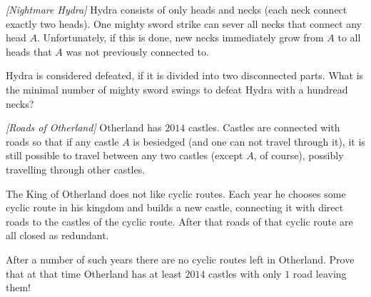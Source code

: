 \begin{problem}
\textit{[Nightmare Hydra]}
Hydra consists of only heads and necks (each neck connect exactly two heads). One mighty sword strike can sever all necks that connect any head $A$. Unfortunately, if this is done, new necks immediately grow from $A$ to all heads that $A$ was not previously connected to.

Hydra is considered defeated, if it is divided into two disconnected parts. What is the minimal number of mighty sword swings to defeat Hydra with a hundread necks?
\end{problem}
%

\begin{problem}
\textit{[Roads of Otherland]}
Otherland has $2014$ castles. Castles are connected with roads so that if any castle $A$ is besiedged (and one can not travel through it), it is still possible to travel between any two castles (except $A$, of course), possibly travelling through other castles. 

The King of Otherland does not like cyclic routes. Each year he chooses some cyclic route in his kingdom and builds a new castle, connecting it with direct roads to the castles of the cyclic route. After that roads of that cyclic route are all closed as redundant.

After a number of such years there are no cyclic routes left in Otherland. Prove that at that time Otherland has at least $2014$ castles with only $1$ road leaving them!
\end{problem}
%

%
%
%
% 
%


